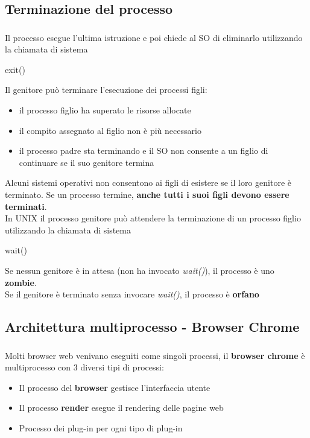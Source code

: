 \documentclass{beamer}
\newenvironment{mainframe}{
	\begin{frame}
		\frametitle{\insertsubsection}
		\framesubtitle{\insertsection}
	}{
	\end{frame}
}
\begin{document}
\subsection{Terminazione del processo}
\begin{mainframe}
	Il processo esegue l'ultima istruzione e poi chiede al SO di eliminarlo utilizzando la chiamata di sistema 
	\begin{semiverbatim}
		exit()
	\end{semiverbatim}
	Il genitore può terminare l'esecuzione dei processi figli:
	\begin{itemize}
		\item il processo figlio ha superato le risorse allocate
		\item il compito assegnato al figlio non è più necessario
		\item il processo padre sta terminando e il SO non consente a un figlio di continuare se il suo genitore termina
	\end{itemize}
\end{mainframe}
\begin{frame}
	Alcuni sistemi operativi non consentono ai figli di esistere se il loro genitore è terminato. Se un processo termine, \textbf{anche tutti i suoi figli devono essere terminati}.\\
	In UNIX il processo genitore può attendere la terminazione di un processo figlio utilizzando la chiamata di sistema \begin{semiverbatim}
		wait()
	\end{semiverbatim}
	Se nessun genitore è in attesa (non ha invocato \textit{wait()}), il processo è uno \textbf{zombie}.\\
	Se il genitore è terminato senza invocare \textit{wait()}, il processo è \textbf{orfano}
\end{frame}
\subsection{Architettura multiprocesso - Browser Chrome}
\begin{mainframe}
	Molti browser web venivano eseguiti come singoli processi, il \textbf{browser chrome} è multiprocesso con 3 diversi tipi di processi:
	\begin{itemize}
		\item Il processo del \textbf{browser} gestisce l'interfaccia utente
		\item Il processo \textbf{render} esegue il rendering delle pagine web
		\item Processo dei plug-in per ogni tipo di plug-in
	\end{itemize}
\end{mainframe}
\end{document}
